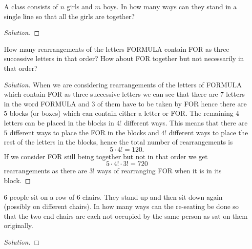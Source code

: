 \documentclass[10pt, a4paper]{article}
\begin{document}
\newpage

\begin{problem}[Q14]
    A class consists of $n$ girls and $m$ boys. In how many ways can they stand in a single line so that all the girls are together?

    \begin{proof}[Solution]\renewcommand{\qedsymbol}{}
        
    \end{proof}
\end{problem}

\newpage

\begin{problem}[Q15]
    How many rearrangements of the letters FORMULA contain FOR as three successive letters in that order? How about FOR together but not necessarily in that order?
    \begin{proof}[Solution]\renewcommand{\qedsymbol}{}
        When we are considering rearrangements of the letters of FORMULA which contain FOR as three successive letters we can see that there are $7$ letters in the word FORMULA and $3$ of them have to be taken by FOR hence there are $5$ blocks (or boxes) which can contain either a letter or FOR. The remaining $4$ letters can be placed in the blocks in $4!$ different ways. This means that there are $5$ different ways to place the FOR in the blocks and $4!$ different ways to place the rest of the letters in the blocks, hence the total number of rearrangements is
        \[
        5 \cdot 4! = 120.
        \]
        If we consider FOR still being together but not in that order we get
        \[
        5 \cdot 4! \cdot 3! = 720
        \]
        rearrangements as there are $3!$ ways of rearranging FOR when it is in its block.
    \end{proof}
\end{problem}

\newpage

\begin{problem}[Q16]
    $6$ people sit on a row of $6$ chairs. They stand up and then sit down again (possibly on different chairs). In how many ways can the re-seating be done so that the two end chairs are each not occupied by the same person as sat on them originally.
    \begin{proof}[Solution]\renewcommand{\qedsymbol}{}
        
    \end{proof}
\end{problem}

\newpage
\end{document}
